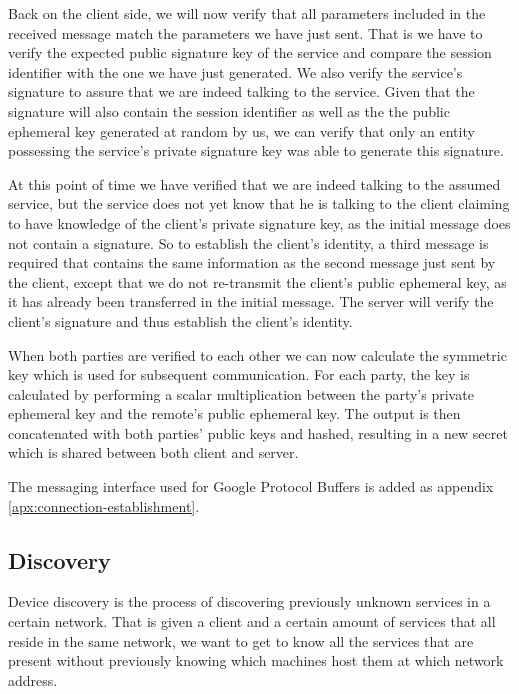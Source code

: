 Back on the client side, we will now verify that all parameters included in the received message match the parameters we have just sent.
That is we have to verify the expected public signature key of the service and compare the session identifier with the one we have just generated.
We also verify the service's signature to assure that we are indeed talking to the service.
Given that the signature will also contain the session identifier as well as the the public ephemeral key generated at random by us, we can verify that only an entity possessing the service's private signature key was able to generate this signature.

At this point of time we have verified that we are indeed talking to the assumed service, but the service does not yet know that he is talking to the client claiming to have knowledge of the client's private signature key, as the initial message does not contain a signature.
So to establish the client's identity, a third message is required that contains the same information as the second message just sent by the client, except that we do not re-transmit the client's public ephemeral key, as it has already been transferred in the initial message.
The server will verify the client's signature and thus establish the client's identity.

When both parties are verified to each other we can now calculate the symmetric key which is used for subsequent communication.
For each party, the key is calculated by performing a scalar multiplication between the party's private ephemeral key and the remote's public ephemeral key.
The output is then concatenated with both parties' public keys and hashed, resulting in a new secret which is shared between both client and server.

The messaging interface used for Google Protocol Buffers is added as appendix \ref{apx:connection-establishment}.

\subsection{Discovery}
\label{sec:discovery}

Device discovery is the process of discovering previously unknown services in a certain network.
That is given a client and a certain amount of services that all reside in the same network, we want to get to know all the services that are present without previously knowing which machines host them at which network address.

